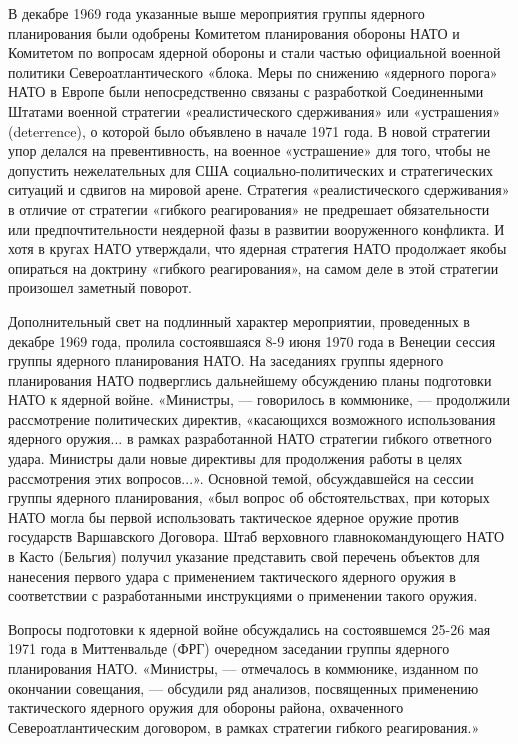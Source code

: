 \documentclass[12pt, a4paper, openany]{book}
\begin{document}
	В декабре 1969 года указанные выше мероприятия группы ядерного планирования были одобрены Комитетом планирования обороны НАТО и Комитетом по вопросам ядерной обороны и стали частью официальной военной политики Североатлантического «блока. Меры по снижению «ядерного порога» НАТО в Европе были непосредственно связаны с разработкой Соединенными Штатами военной стратегии «реалистического сдерживания» или «устрашения» (deterrence), о которой было объявлено в начале 1971 года. В новой стратегии упор делался на превентивность, на военное «устрашение» для того, чтобы не допустить нежелательных для США социально-политических и стратегических ситуаций и сдвигов на мировой арене. Стратегия «реалистического сдерживания» в отличие от стратегии «гибкого реагирования» не предрешает обязательности или предпочтительности неядерной фазы в развитии вооруженного конфликта. И хотя в кругах НАТО утверждали, что ядерная стратегия НАТО продолжает якобы опираться на доктрину «гибкого реагирования», на самом деле в этой стратегии произошел заметный поворот.
	
	Дополнительный свет на подлинный характер мероприятии, проведенных в декабре 1969 года, пролила состоявшаяся 8-9 июня 1970 года в Венеции сессия группы ядерного планирования НАТО. На заседаниях группы ядерного планирования НАТО подверглись дальнейшему обсуждению планы подготовки НАТО к ядерной войне. «Министры, — говорилось в коммюнике, — продолжили рассмотрение политических директив, «касающихся возможного использования ядерного оружия... в рамках разработанной НАТО стратегии гибкого ответного удара. Министры дали новые директивы для продолжения работы в целях рассмотрения этих вопросов...». Основной темой, обсуждавшейся на сессии группы ядерного планирования, «был вопрос об обстоятельствах, при которых НАТО могла бы первой использовать тактическое ядерное оружие против государств Варшавского Договора. Штаб верховного главнокомандующего НАТО в Касто (Бельгия) получил указание представить свой перечень объектов для нанесения первого удара с применением тактического ядерного оружия в соответствии с разработанными инструкциями о применении такого оружия.
	
	Вопросы подготовки к ядерной войне обсуждались на состоявшемся 25-26 мая 1971 года в Миттенвальде (ФРГ) очередном заседании группы ядерного планирования НАТО. «Министры, — отмечалось в коммюнике, изданном по окончании совещания, — обсудили ряд анализов, посвященных применению тактического ядерного оружия для обороны района, охваченного Североатлантическим договором, в рамках стратегии гибкого реагирования.»
	
\end{document}
